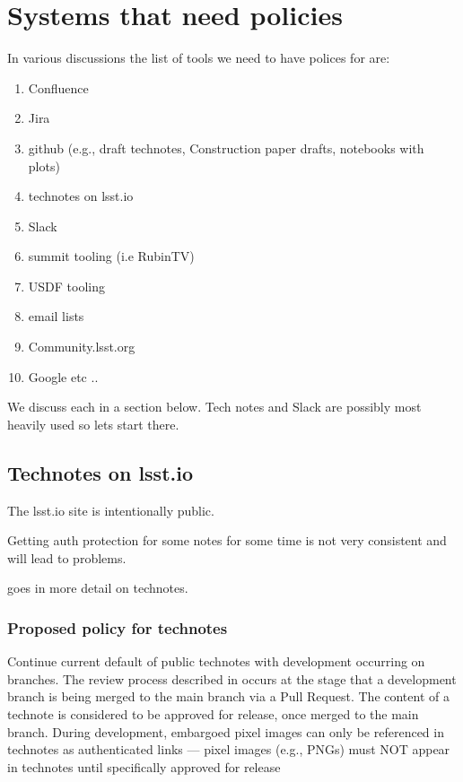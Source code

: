 \section {Systems that need policies}
In various discussions the list of tools we need to have polices for are:

\begin{enumerate}
    \item Confluence
    \item Jira
    \item github (e.g., draft technotes, Construction paper drafts, notebooks with plots)
    \item technotes on lsst.io
    \item Slack
    \item summit tooling (i.e RubinTV)
    \item USDF tooling
    \item email lists
    \item Community.lsst.org
    \item Google etc ..
\end{enumerate}

We discuss each in a section below.
Tech notes and Slack are possibly most heavily used so lets start there.



\subsection{Technotes on lsst.io}
The lsst.io site is intentionally public.

Getting auth protection for some notes for some time is not very consistent and will lead to problems.

 goes in more detail on technotes.

\subsubsection{Proposed policy for technotes}
Continue current default of public technotes with development occurring on branches. The review process described in  occurs at the stage that a development branch is being merged to the main branch via a Pull Request. The content of a technote is considered to be approved for release, once merged to the main branch.
During development, embargoed pixel images can only be referenced in technotes as authenticated links --- pixel images (e.g., PNGs) must NOT appear in technotes until specifically approved for release

